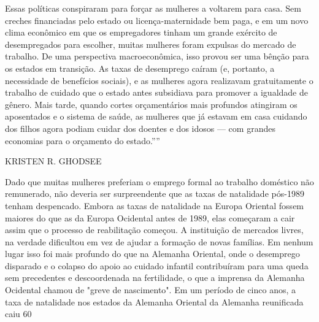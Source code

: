  \par 
Essas políticas conspiraram para forçar as mulheres a voltarem para casa. Sem creches financiadas pelo estado ou licença-maternidade bem paga, e em um novo clima econômico em que os empregadores tinham um grande exército de desempregados para escolher, muitas mulheres foram expulsas do mercado de trabalho. De uma perspectiva macroeconômica, isso provou ser uma bênção para os estados em transição. As taxas de desemprego caíram (e, portanto, a necessidade de benefícios sociais), e as mulheres agora realizavam gratuitamente o trabalho de cuidado que o estado antes subsidiava para promover a igualdade de gênero. Mais tarde, quando cortes orçamentários mais profundos atingiram os aposentados e o sistema de saúde, as mulheres que já estavam em casa cuidando dos filhos agora podiam cuidar dos doentes e dos idosos — com grandes economias para o orçamento do estado.””
 \par 
KRISTEN R. GHODSEE
 \par 
Dado que muitas mulheres preferiam o emprego formal ao trabalho doméstico não remunerado, não deveria ser surpreendente que as taxas de natalidade pós-1989 tenham despencado. Embora as taxas de natalidade na Europa Oriental fossem maiores do que as da Europa Ocidental antes de 1989, elas começaram a cair assim que o processo de reabilitação começou. A instituição de mercados livres, na verdade dificultou em vez de ajudar a formação de novas famílias. Em nenhum lugar isso foi mais profundo do que na Alemanha Oriental, onde o desemprego disparado e o colapso do apoio ao cuidado infantil contribuíram para uma queda sem precedentes e descoordenada na fertilidade, o que a imprensa da Alemanha Ocidental chamou de "greve de nascimento". Em um período de cinco anos, a taxa de natalidade nos estados da Alemanha Oriental da Alemanha reunificada caiu 60%
